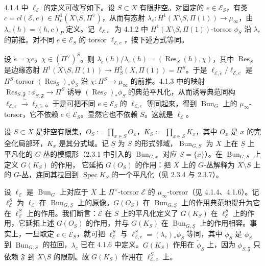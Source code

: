  4.1.4 中 $\ell_{\mathcal{E}}$ 的定义可改写如下。设 $S\subset X$ 有限非空。对固定的 $e\in\mathcal{E}_S$，有类 $c=cl(\mathcal{E},e)\in H^1_c(X\setminus S,\Pi^{\vee})$，从而有态射 $\lambda_e:H^1(X\setminus S,\Pi(1))\to\mu_\infty$，由 $\lambda_e(h)=(h,c)_P$ 定义。记 $\ell_{\mathcal{E},e}$ 为 4.1.2 中 $H^1(X\setminus S,\Pi(1))$-torsor $\phi_S$ 沿 $\lambda_e$ 的前推。对不同 $e\in\mathcal{E}_S$ 的 torsor $\ell_{\mathcal{E},e}$，按下述方式等同。

设 $\tilde e=\chi e$，$\chi\in(\Pi^{\vee})^S$。则 $\lambda_{\tilde e}(h)/\lambda_e(h)=(\operatorname{Res}_S(h),\chi)$，其中 $\operatorname{Res}_S$ 是边缘态射 $H^1(X\setminus S,\Pi(1))\to H^2_S(X,\Pi(1))=\Pi^S$。于是 $\ell_{\mathcal{E},\tilde e}/\ell_{\mathcal{E},e}$ 是 $\Pi^S$-torsor $(\operatorname{Res}_S)_*\phi_S$ 沿 $\chi:\Pi^S\to\mu_\infty$ 的前推。4.1.3 中的映射 $\operatorname{Res}_{S,\mathfrak{F}}:\phi_{S,\mathfrak{F}}\to\Pi^S$ 诱导 $(\operatorname{Res}_S)_*\phi_S$ 的典范平凡化，从而诱导典范同构 $\ell_{\mathcal{E},e}\xrightarrow{\ \sim\ }\ell_{\mathcal{E},\tilde e}$。于是可把不同 $e\in\mathcal{E}_S$ 的 $\ell_{\mathcal{E},e}$ 等同起来，得到 $\operatorname{Bun}_G$ 上的 $\mu_\infty$-torsor，它不依赖 $e\in\mathcal{E}_S$。显然它也不依赖 $S$。这就是 $\ell_{\mathcal{E}}$。

 设 $S\subset X$ 是非空有限集，$O_S:=\prod_{x\in S}O_x$，$K_S:=\prod_{x\in S}K_x$，其中 $O_x$ 是 $x$ 的完全化局部环，$K_x$ 是其分式域。记 $\underline{S}$ 为 $S$ 的形式邻域，$\operatorname{Bun}_{G,\underline{S}}$ 为 $X$ 上在 $\underline{S}$ 上平凡化的 $G$-丛的模概形（2.3.1 中引入的 $\operatorname{Bun}_{G,x}$ 对应 $S=\{x\}$）。在 $\operatorname{Bun}_{G,\underline{S}}$ 上定义 $G(K_S)$ 的作用，
它延拓 $G(O_S)$ 的作用：把 $X$ 上的 $G$-丛解释为 $X\setminus S$ 上的 $G$-丛，连同其拉回到 $\operatorname{Spec} K_S$ 的一个平凡化（见 2.3.4 与 2.3.7）。

设 $\ell_{\mathcal{E}}$ 是 $\operatorname{Bun}_G$ 上对应于 $X$ 上 $\Pi^{\vee}$-torsor $\mathcal{E}$ 的 $\mu_\infty$-torsor（见 4.1.4、4.1.6）。记 $\ell^S_{\mathcal{E}}$ 为 $\ell_{\mathcal{E}}$ 在 $\operatorname{Bun}_{G,\underline{S}}$ 上的原像。$G(O_S)$ 在 $\operatorname{Bun}_{G,\underline{S}}$ 上的作用典范地提升为它在 $\ell^S_{\mathcal{E}}$ 上的作用。我们断言：$\mathcal{E}$ 在 $S$ 上的平凡化定义了 $G(K_S)$ 在 $\ell^S_{\mathcal{E}}$ 上的作用，它延拓上述 $G(O_S)$ 的作用，并与 $G(K_S)$ 在 $\operatorname{Bun}_{G,\underline{S}}$ 上的作用相容。事实上，一旦取定 $e\in\mathcal{E}_S$，就可把 $\ell^S_{\mathcal{E}}$ 与 $\ell^S_{\mathcal{E},e}=(\lambda_e)_*\tilde\phi_S$ 等同，其中 $\tilde\phi_S$ 是 $\phi_S$ 到 $\operatorname{Bun}_{G,\underline{S}}$ 的拉回，$\lambda_e$ 已在 4.1.6 中定义。$G(K_S)$ 作用在 $\tilde\phi_S$ 上，因为 $\phi_{S,\mathfrak{F}}$ 只依赖 $\mathfrak{F}$ 到 $X\setminus S$ 的限制。故 $G(K_S)$ 作用在 $\ell^S_{\mathcal{E},e}$ 上。

